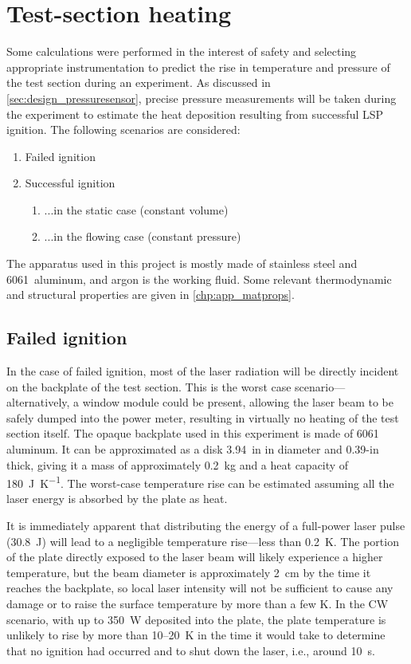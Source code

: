     \section{Test-section heating}
        Some calculations were performed in the interest of safety and selecting appropriate instrumentation to predict the rise in temperature and pressure of the test section during an experiment. As discussed in \autoref{sec:design_pressuresensor}, precise pressure measurements will be taken during the experiment to estimate the heat deposition resulting from successful LSP ignition. The following scenarios are considered:
        \begin{enumerate}
            \item Failed ignition
            \item Successful ignition
            \begin{enumerate}
                \item ...in the static case (constant volume)
                \item ...in the flowing case (constant pressure)
            \end{enumerate}
        \end{enumerate}
        The apparatus used in this project is mostly made of stainless steel and 6061~aluminum, and argon is the working fluid. Some relevant thermodynamic and structural properties are given in \autoref{chp:app_matprops}.

        \subsection{Failed ignition}
            In the case of failed ignition, most of the laser radiation will be directly incident on the backplate of the test section. This is the worst case scenario---alternatively, a window module could be present, allowing the laser beam to be safely dumped into the power meter, resulting in virtually no heating of the test section itself. The opaque backplate used in this experiment is made of 6061 aluminum. It can be approximated as a disk \qty{3.94}{in} in diameter and 0.39-in thick, giving it a mass of approximately \qty{0.2}{kg} and a heat capacity of \qty{180}{J.K^{-1}}. The worst-case temperature rise can be estimated assuming all the laser energy is absorbed by the plate as heat.

            It is immediately apparent that distributing the energy of a full-power laser pulse (\qty{30.8}{J}) will lead to a negligible temperature rise---less than \qty{0.2}{K}. The portion of the plate directly exposed to the laser beam will likely experience a higher temperature, but the beam diameter is approximately \qty{2}{cm} by the time it reaches the backplate, so local laser intensity will not be sufficient to cause any damage or to raise the surface temperature by more than a few K. In the CW scenario, with up to \qty{350}{W} deposited into the plate, the plate temperature is unlikely to rise by more than 10--20~K in the time it would take to determine that no ignition had occurred and to shut down the laser, i.e., around 10~s.

